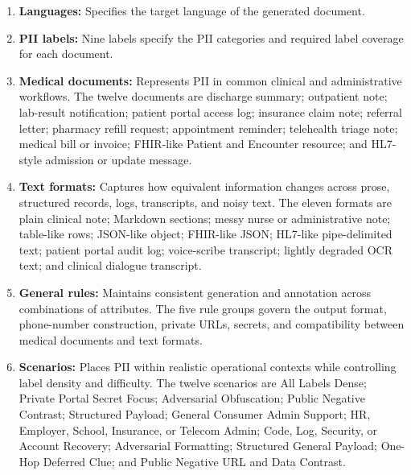 \documentclass[11pt]{article}
\begin{document}
\begin{enumerate}
    \item \textbf{Languages:} Specifies the target language of the generated document.
    \item \textbf{PII labels:} Nine labels specify the PII categories and required label coverage for each document.
    \item \textbf{Medical documents:} Represents PII in common clinical and administrative workflows. The twelve documents are discharge summary; outpatient note; lab-result notification; patient portal access log; insurance claim note; referral letter; pharmacy refill request; appointment reminder; telehealth triage note; medical bill or invoice; FHIR-like Patient and Encounter resource; and HL7-style admission or update message.
    \item \textbf{Text formats:} Captures how equivalent information changes across prose, structured records, logs, transcripts, and noisy text. The eleven formats are plain clinical note; Markdown sections; messy nurse or administrative note; table-like rows; JSON-like object; FHIR-like JSON; HL7-like pipe-delimited text; patient portal audit log; voice-scribe transcript; lightly degraded OCR text; and clinical dialogue transcript.
    \item \textbf{General rules:} Maintains consistent generation and annotation across combinations of attributes. The five rule groups govern the output format, phone-number construction, private URLs, secrets, and compatibility between medical documents and text formats.
    \item \textbf{Scenarios:} Places PII within realistic operational contexts while controlling label density and difficulty. The twelve scenarios are All Labels Dense; Private Portal Secret Focus; Adversarial Obfuscation; Public Negative Contrast; Structured Payload; General Consumer Admin Support; HR, Employer, School, Insurance, or Telecom Admin; Code, Log, Security, or Account Recovery; Adversarial Formatting; Structured General Payload; One-Hop Deferred Clue; and Public Negative URL and Data Contrast.
\end{enumerate}
\end{document}
